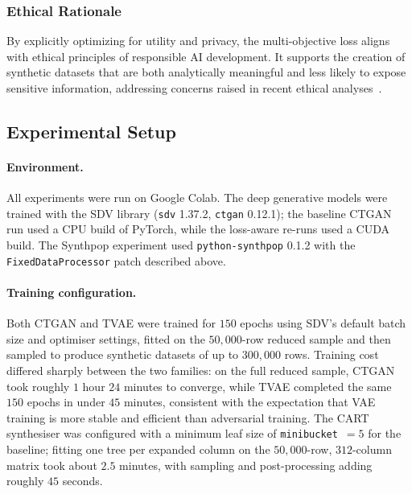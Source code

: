 \documentclass[11pt]{article}
\begin{document}
\subsubsection{Ethical Rationale} %

By explicitly optimizing for utility and privacy, the multi-objective loss aligns with ethical principles of responsible AI development. It supports the creation of synthetic datasets that are both analytically meaningful and less likely to expose sensitive information, addressing concerns raised in recent ethical analyses~\cite{leslie2020ethics, floridi2016data}.


\subsection{Experimental Setup}

\paragraph{Environment.} All experiments were run on Google Colab. The deep generative models were trained with the SDV library (\texttt{sdv} 1.37.2, \texttt{ctgan} 0.12.1); the baseline CTGAN run used a CPU build of PyTorch, while the loss-aware re-runs used a CUDA build. The Synthpop experiment used \texttt{python-synthpop} 0.1.2 with the \texttt{FixedDataProcessor} patch described above.

\paragraph{Training configuration.} Both CTGAN and TVAE were trained for $150$ epochs using SDV's default batch size and optimiser settings, fitted on the $50{,}000$-row reduced sample and then sampled to produce synthetic datasets of up to $300{,}000$ rows. Training cost differed sharply between the two families: on the full reduced sample, CTGAN took roughly $1$ hour $24$ minutes to converge, while TVAE completed the same $150$ epochs in under $45$ minutes, consistent with the expectation that VAE training is more stable and efficient than adversarial training. The CART synthesiser was configured with a minimum leaf size of \texttt{minibucket}~$=5$ for the baseline; fitting one tree per expanded column on the $50{,}000$-row, $312$-column matrix took about $2.5$ minutes, with sampling and post-processing adding roughly $45$ seconds.
\end{document}
